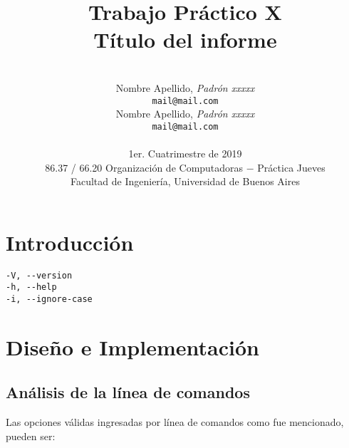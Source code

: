 \documentclass[a4paper, 10pt, twoside, notitlepage]{article}
\title{\textbf{Trabajo Práctico X\\Título del informe} \\}
\author{ \\
         Nombre Apellido, \textit{Padrón xxxxx} \\
          \texttt{ mail@mail.com }       \\
		  [2.5ex]
         Nombre Apellido, \textit{Padrón xxxxx}     \\
          \texttt{mail@mail.com}                      \\ 
		  [2.5ex]
		 \\
         \normalsize{1er. Cuatrimestre de 2019}            \\
         \normalsize{86.37 / 66.20 Organización de Computadoras $-$ Práctica Jueves} \\
         \normalsize{Facultad de Ingeniería, Universidad de Buenos Aires} 
       }
\date{}
\begin{document}
\maketitle

\begin{abstract}
\lipsum[3-3]
\end{abstract}

% 
% 

\pagestyle{fancy}
\fancyhead{}
\fancyfoot{}
\renewcommand{\sectionmark}[1]{\markright{\thesection\ #1}}
\renewcommand{\headrulewidth}{0.4pt}
\fancyhead[LE]{\nouppercase \rightmark}
\fancyhead[RE, LO]{\bf \thepage}
\fancyhead[RO]{\nouppercase \rightmark}
\fancyfoot[C]{ }
\maketitle
\setcounter{page}{1}

\parskip 7.2pt
\section{Introducción}
\lipsum[3-3]


\begin{verbatim}
-V, --version
-h, --help
-i, --ignore-case 
\end{verbatim}


\section{Diseño e Implementación}

\subsection{Análisis de la línea de comandos}
Las opciones válidas ingresadas por línea de comandos como fue mencionado, pueden ser:
\end{document}
